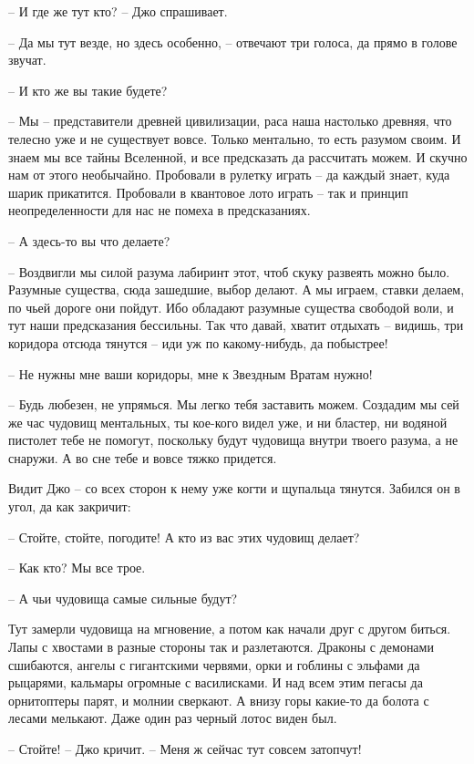 \documentclass[ebook,oneside,final,openright]{memoir}
\begin{document}
– И где же тут кто? – Джо спрашивает.\par
– Да мы тут везде, но здесь особенно, – отвечают три голоса, да прямо в голове звучат.\par
– И кто же вы такие будете?\par
– Мы – представители древней цивилизации, раса наша настолько древняя, что телесно уже и не существует вовсе. Только ментально, то есть разумом своим. И знаем мы все тайны Вселенной, и все предсказать да рассчитать можем. И скучно нам от этого необычайно. Пробовали в рулетку играть – да каждый знает, куда шарик прикатится. Пробовали в квантовое лото играть – так и принцип неопределенности для нас не помеха в предсказаниях.\par
– А здесь-то вы что делаете?\par
– Воздвигли мы силой разума лабиринт этот, чтоб скуку развеять можно было. Разумные существа, сюда зашедшие, выбор делают. А мы играем, ставки делаем, по чьей дороге они пойдут. Ибо обладают разумные существа свободой воли, и тут наши предсказания бессильны. Так что давай, хватит отдыхать – видишь, три коридора отсюда тянутся – иди уж по какому-нибудь, да побыстрее!\par
– Не нужны мне ваши коридоры, мне к Звездным Вратам нужно!\par
– Будь любезен, не упрямься. Мы легко тебя заставить можем. Создадим мы сей же час чудовищ ментальных, ты кое-кого видел уже, и ни бластер, ни водяной пистолет тебе не помогут, поскольку будут чудовища внутри твоего разума, а не снаружи. А во сне тебе и вовсе тяжко придется.\par
\par
Видит Джо – со всех сторон к нему уже когти и щупальца тянутся. Забился он в угол, да как закричит:\par
– Стойте, стойте, погодите! А кто из вас этих чудовищ делает?\par
– Как кто? Мы все трое.\par
– А чьи чудовища самые сильные будут?\par
Тут замерли чудовища на мгновение, а потом как начали друг с другом биться. Лапы с хвостами в разные стороны так и разлетаются. Драконы с демонами сшибаются, ангелы с гигантскими червями, орки и гоблины с эльфами да рыцарями, кальмары огромные с василисками. И над всем этим пегасы да орнитоптеры парят, и молнии сверкают. А внизу горы какие-то да болота с лесами мелькают. Даже один раз черный лотос виден был. \par
– Стойте! – Джо кричит. – Меня ж сейчас тут совсем затопчут!\par
\end{document}
